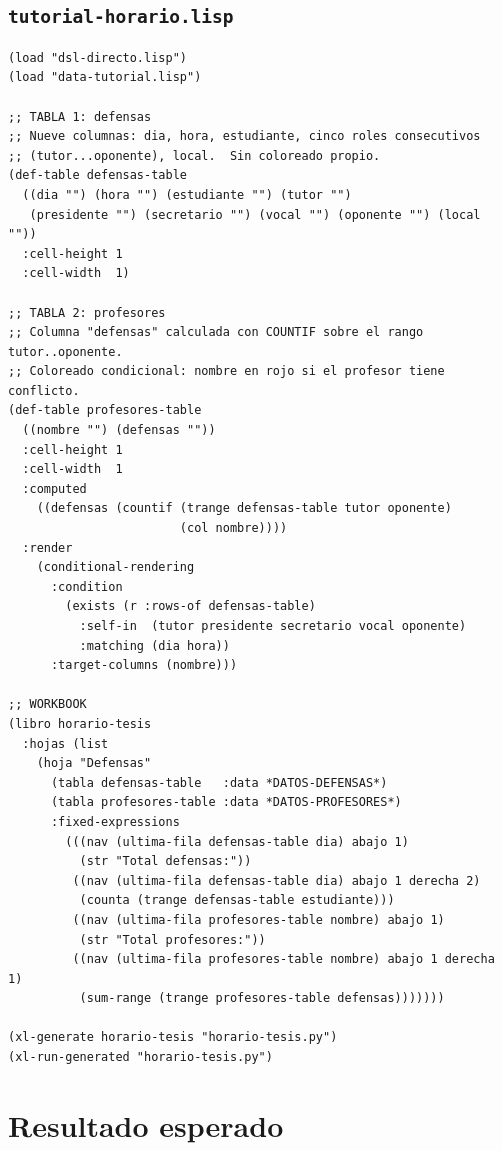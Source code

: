 \documentclass[12pt,a4paper]{report}
\begin{document}
\subsection{\texttt{tutorial-horario.lisp}}

\begin{lstlisting}[caption={tutorial-horario.lisp --- programa DSL completo.}]
(load "dsl-directo.lisp")
(load "data-tutorial.lisp")

;; TABLA 1: defensas
;; Nueve columnas: dia, hora, estudiante, cinco roles consecutivos
;; (tutor...oponente), local.  Sin coloreado propio.
(def-table defensas-table
  ((dia "") (hora "") (estudiante "") (tutor "")
   (presidente "") (secretario "") (vocal "") (oponente "") (local ""))
  :cell-height 1
  :cell-width  1)

;; TABLA 2: profesores
;; Columna "defensas" calculada con COUNTIF sobre el rango tutor..oponente.
;; Coloreado condicional: nombre en rojo si el profesor tiene conflicto.
(def-table profesores-table
  ((nombre "") (defensas ""))
  :cell-height 1
  :cell-width  1
  :computed
    ((defensas (countif (trange defensas-table tutor oponente)
                        (col nombre))))
  :render
    (conditional-rendering
      :condition
        (exists (r :rows-of defensas-table)
          :self-in  (tutor presidente secretario vocal oponente)
          :matching (dia hora))
      :target-columns (nombre)))

;; WORKBOOK
(libro horario-tesis
  :hojas (list
    (hoja "Defensas"
      (tabla defensas-table   :data *DATOS-DEFENSAS*)
      (tabla profesores-table :data *DATOS-PROFESORES*)
      :fixed-expressions
        (((nav (ultima-fila defensas-table dia) abajo 1)
          (str "Total defensas:"))
         ((nav (ultima-fila defensas-table dia) abajo 1 derecha 2)
          (counta (trange defensas-table estudiante)))
         ((nav (ultima-fila profesores-table nombre) abajo 1)
          (str "Total profesores:"))
         ((nav (ultima-fila profesores-table nombre) abajo 1 derecha 1)
          (sum-range (trange profesores-table defensas)))))))

(xl-generate horario-tesis "horario-tesis.py")
(xl-run-generated "horario-tesis.py")
\end{lstlisting}

\section{Resultado esperado}
\label{sec:resultado}
\end{document}
